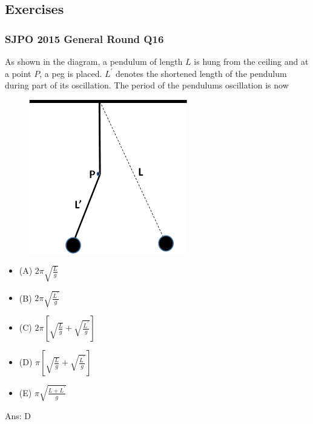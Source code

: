 \documentclass{article}
\begin{document}
\subsection{Exercises}
\begin{samepage}
\subsubsection{SJPO 2015 General Round Q16}
As shown in the diagram, a pendulum of length $L$ is hung from the ceiling and at a point $P$, a peg is placed. $L^{\prime}$ denotes the shortened length of the pendulum during part of its oscillation. The period of the pendulums oscillation is now
\begin{figure}
\includegraphics[width=0.9\linewidth]{images/2015q16.png}
\end{figure}
\begin{itemize}
\item[](A) $2 \pi \sqrt{\frac{L}{g}}$
\item[](B) $2 \pi \sqrt{\frac{L^{\prime}}{g}}$
\item[](C) $2 \pi\left[\sqrt{\frac{L}{g}}+\sqrt{\frac{L^{\prime}}{g}}\right]$
\item[](D) $\pi\left[\sqrt{\frac{L}{g}}+\sqrt{\frac{L^{\prime}}{g}}\right]$
\item[](E) $\pi \sqrt{\frac{L+L^{\prime}}{g}}$
\end{itemize}
Ans: \ifpaper D \fi
\end{samepage}
\end{document}
